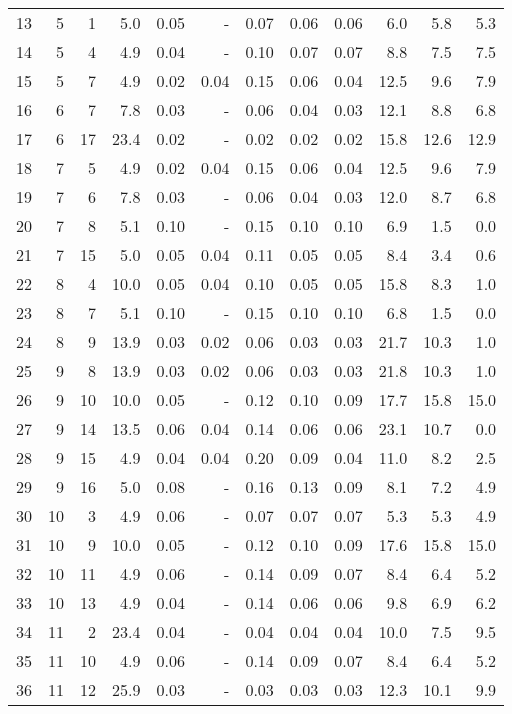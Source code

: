 \begin{small}
\begin{longtable}[c]{lrrrrr|rrr|rrr}
13 & 5 & 1 & 5.0 & 0.05 & - & 0.07 & 0.06 & 0.06 & 6.0 & 5.8 & 5.3 \\
14 & 5 & 4 & 4.9 & 0.04 & - & 0.10 & 0.07 & 0.07 & 8.8 & 7.5 & 7.5 \\
15 & 5 & 7 & 4.9 & 0.02 & 0.04 & 0.15 & 0.06 & 0.04 & 12.5 & 9.6 & 7.9 \\
16 & 6 & 7 & 7.8 & 0.03 & - & 0.06 & 0.04 & 0.03 & 12.1 & 8.8 & 6.8 \\
17 & 6 & 17 & 23.4 & 0.02 & - & 0.02 & 0.02 & 0.02 & 15.8 & 12.6 & 12.9 \\
18 & 7 & 5 & 4.9 & 0.02 & 0.04 & 0.15 & 0.06 & 0.04 & 12.5 & 9.6 & 7.9 \\
19 & 7 & 6 & 7.8 & 0.03 & - & 0.06 & 0.04 & 0.03 & 12.0 & 8.7 & 6.8 \\
20 & 7 & 8 & 5.1 & 0.10 & - & 0.15 & 0.10 & 0.10 & 6.9 & 1.5 & 0.0 \\
21 & 7 & 15 & 5.0 & 0.05 & 0.04 & 0.11 & 0.05 & 0.05 & 8.4 & 3.4 & 0.6 \\
22 & 8 & 4 & 10.0 & 0.05 & 0.04 & 0.10 & 0.05 & 0.05 & 15.8 & 8.3 & 1.0 \\
23 & 8 & 7 & 5.1 & 0.10 & - & 0.15 & 0.10 & 0.10 & 6.8 & 1.5 & 0.0 \\
24 & 8 & 9 & 13.9 & 0.03 & 0.02 & 0.06 & 0.03 & 0.03 & 21.7 & 10.3 & 1.0 \\
25 & 9 & 8 & 13.9 & 0.03 & 0.02 & 0.06 & 0.03 & 0.03 & 21.8 & 10.3 & 1.0 \\
26 & 9 & 10 & 10.0 & 0.05 & - & 0.12 & 0.10 & 0.09 & 17.7 & 15.8 & 15.0 \\
27 & 9 & 14 & 13.5 & 0.06 & 0.04 & 0.14 & 0.06 & 0.06 & 23.1 & 10.7 & 0.0 \\
28 & 9 & 15 & 4.9 & 0.04 & 0.04 & 0.20 & 0.09 & 0.04 & 11.0 & 8.2 & 2.5 \\
29 & 9 & 16 & 5.0 & 0.08 & - & 0.16 & 0.13 & 0.09 & 8.1 & 7.2 & 4.9 \\
30 & 10 & 3 & 4.9 & 0.06 & - & 0.07 & 0.07 & 0.07 & 5.3 & 5.3 & 4.9 \\
31 & 10 & 9 & 10.0 & 0.05 & - & 0.12 & 0.10 & 0.09 & 17.6 & 15.8 & 15.0 \\
32 & 10 & 11 & 4.9 & 0.06 & - & 0.14 & 0.09 & 0.07 & 8.4 & 6.4 & 5.2 \\
33 & 10 & 13 & 4.9 & 0.04 & - & 0.14 & 0.06 & 0.06 & 9.8 & 6.9 & 6.2 \\
34 & 11 & 2 & 23.4 & 0.04 & - & 0.04 & 0.04 & 0.04 & 10.0 & 7.5 & 9.5 \\
35 & 11 & 10 & 4.9 & 0.06 & - & 0.14 & 0.09 & 0.07 & 8.4 & 6.4 & 5.2 \\
36 & 11 & 12 & 25.9 & 0.03 & - & 0.03 & 0.03 & 0.03 & 12.3 & 10.1 & 9.9 \\

\end{longtable}
\end{small}
